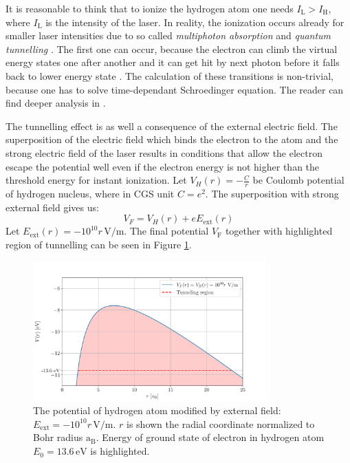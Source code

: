 It is reasonable to think that to ionize the hydrogen atom one needs $I_\mathrm{L}>I_{\mathrm{H}}$, where $I_{\mathrm{L}}$ is the intensity of the laser. In reality, the ionization occurs already for smaller laser intensities due to so called \textit{multiphoton absorption} \cite{plasma-intro} and \textit{quantum tunnelling} \cite{laser-plasma1}. The first one can occur, because the electron can climb the virtual energy states one after another and it can get hit by next photon before it falls back to lower energy state \cite{laser-plasma1}. The calculation of these transitions is non-trivial, because one has to solve time-dependant Schroedinger equation. The reader can find deeper analysis in \cite{atoms-in-lasers}.

The tunnelling effect is as well a consequence of the external electric field. The superposition of the electric field which binds the electron to the atom and the strong electric field of the laser results in conditions that allow the electron escape the potential well even if the electron energy is not higher than the threshold energy for instant ionization. Let $V_H(r)= -\frac{C}{r}$ be Coulomb potential of hydrogen nucleus, where in CGS unit $C = e^2$. The superposition with strong external field gives us:
\begin{equation}
	V_F = V_H(r) + eE_{\mathrm{ext}}(r)
\end{equation}
Let $E_{\mathrm{ext}}(r) = -10^{10}r\,\mathrm{V/m}$. The final potential $V_\mathrm{F}$ together with highlighted region of tunnelling can be seen in Figure \ref{fig:tunnelling}. 

\begin{figure}[h]
	\centering
	\includegraphics[width=0.8\textwidth]{figures/tunnelling}
	\caption{The potential of hydrogen atom modified by external field: $E_{\mathrm{ext}} = -10^{10}r\,\mathrm{V/m}$. $r$ is shown the radial coordinate normalized to Bohr radius $\mathrm{a_B}$. Energy of ground state of electron in hydrogen atom $E_0 = 13.6\, \mathrm{eV}$ is highlighted.}
	\label{fig:tunnelling}
\end{figure}


